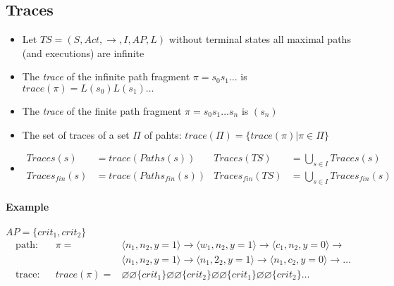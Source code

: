\documentclass[a4paper, 10pt]{article}
\begin{document}
\subsection*{Traces}
\begin{shaded}
    \begin{itemize}
        \item Let $TS=(S,Act,\to,I,AP,L)$ without terminal states {\tiny all maximal paths (and executions) are infinite}
        \item The \emph{trace} of the infinite path fragment $\pi=s_0s_1\dots$ is $trace(\pi)=L(s_0)L(s_1)\dots$
        \item The \emph{trace} of the finite path fragment $\pi=s_0s_1\dots s_n$ is $(s_n)$
        \item The set of traces of a set $\Pi$ of pahts: $trace(\Pi)=\{ trace(\pi) | \pi\in\Pi \}$
        \item %
        \begin{align*}
        Traces(s)&=trace(Paths(s)) & Traces(TS)&=\bigcup_{s\in I} Traces(s) \\
        Traces_{fin}(s)&=trace(Paths_{fin}(s)) & Traces_{fin}(TS)&=\bigcup_{s\in I} Traces_{fin}(s)
        \end{align*}
    \end{itemize}
\end{shaded}
\paragraph*{Example}
$AP=\{ crit_1,crit_2 \}$
\begin{align*}
\textrm{path:} & & %
\pi = &
    \langle n_1,n_2,y=1 \rangle \to
    \langle w_1,n_2,y=1 \rangle \to
    \langle c_1,n_2,y=0 \rangle \to \\
    & & &
    \langle n_1,n_2,y=1 \rangle \to
    \langle n_1,2_2,y=1 \rangle \to
    \langle n_1,c_2,y=0 \rangle \to \dots \\
\textrm{trace:} & & %
trace(\pi) = &
    \varnothing\varnothing \{crit_1\}\varnothing\varnothing\{crit_2\}\varnothing\varnothing \{crit_1\}\varnothing\varnothing\{crit_2\}\dots
\end{align*}
\end{document}
